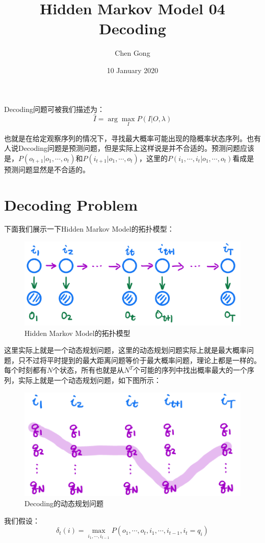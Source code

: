 \documentclass[a4paper]{article}
\title{Hidden Markov Model 04 Decoding}
\author{Chen Gong}
\date{10 January 2020}
\begin{document}
\maketitle
Decoding问题可被我们描述为：
\begin{equation}
    \hat{I} = \arg\max_{I} P(I|O,\lambda)
\end{equation}

也就是在给定观察序列的情况下，寻找最大概率可能出现的隐概率状态序列。也有人说Decoding问题是预测问题，但是实际上这样说是并不合适的。预测问题应该是，$P(o_{t+1}|o_1,\cdots,o_t)$和$P(i_{t+1}|o_1,\cdots,o_t)$，这里的$P(i_{1},\cdots,i_t|o_1,\cdots,o_t)$看成是预测问题显然是不合适的。

\section{Decoding Problem}
下面我们展示一下Hidden Markov Model的拓扑模型：
\begin{figure}[H]
    \centering
    \includegraphics[width=.5\textwidth]{微信图片_20200109224115.png}
    \caption{Hidden Markov Model的拓扑模型}
    \label{fig:my_label_1}
\end{figure}

这里实际上就是一个动态规划问题，这里的动态规划问题实际上就是最大概率问题，只不过将平时提到的最大距离问题等价于最大概率问题，理论上都是一样的。每个时刻都有$N$个状态，所有也就是从$N^T$个可能的序列中找出概率最大的一个序列，实际上就是一个动态规划问题，如下图所示：
\begin{figure}[H]
    \centering
    \includegraphics[width=.5\textwidth]{微信图片_20200109225254.png}
    \caption{Decoding的动态规划问题}
    \label{fig:my_label_1}
\end{figure}

我们假设：
\begin{equation}
    \delta_t(i) = \max_{i_1,\cdots,i_{t-1}} P(o_1,\cdots,o_t,i_1,\cdots,i_{t-1},i_t=q_i)
\end{equation}
\end{document}
